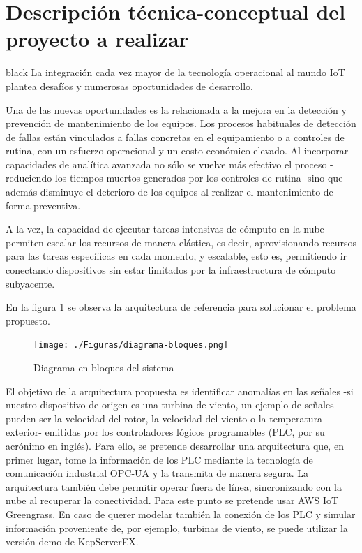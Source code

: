 \documentclass[11pt]{charter}
\begin{document}
\section{Descripción técnica-conceptual del proyecto a realizar}
\label{sec:descripcion}

\begin{consigna}{black}
La integración cada vez mayor de la tecnología operacional al mundo IoT plantea desafíos y numerosas oportunidades de desarrollo. 

Una de las nuevas oportunidades es la relacionada a la mejora en la detección y prevención de mantenimiento de los equipos. Los procesos habituales de detección de fallas están vinculados a fallas concretas en el equipamiento o a controles de rutina, con un esfuerzo operacional y un costo económico elevado. Al incorporar capacidades de analítica avanzada no sólo se vuelve más efectivo el proceso -reduciendo los tiempos muertos generados por los controles de rutina- sino que además disminuye el deterioro de los equipos al realizar el mantenimiento de forma preventiva. 

A la vez, la capacidad de ejecutar tareas intensivas de cómputo en la nube permiten escalar los recursos de manera elástica, es decir, aprovisionando recursos para las tareas específicas en cada momento, y escalable, esto es, permitiendo ir conectando dispositivos sin estar limitados por la infraestructura de cómputo subyacente.

En la figura 1 se observa la arquitectura de referencia para solucionar el problema propuesto.


\vspace{25px}

\begin{figure}[htpb]
\centering 
\texttt{[image: ./Figuras/diagrama-bloques.png]}
\caption{Diagrama en bloques del sistema}
\label{fig:diagBloques}
\end{figure}


\vspace{25px}

El objetivo de la arquitectura propuesta es identificar anomalías en las señales -si nuestro dispositivo de origen es una turbina de viento, un ejemplo de señales pueden ser la velocidad del rotor, la velocidad del viento o la temperatura exterior- emitidas por los controladores lógicos programables (PLC, por su acrónimo en inglés). Para ello, se pretende desarrollar una arquitectura que, en primer lugar, tome la información de los PLC mediante la tecnología de comunicación industrial OPC-UA y la transmita de manera segura. La arquitectura también debe permitir operar fuera de línea, sincronizando con la nube al recuperar la conectividad. Para este punto se pretende usar AWS IoT Greengrass. En caso de querer modelar también la conexión de los PLC y simular información proveniente de, por ejemplo, turbinas de viento, se puede utilizar la versión demo de KepServerEX. 


\end{consigna}
\end{document}
